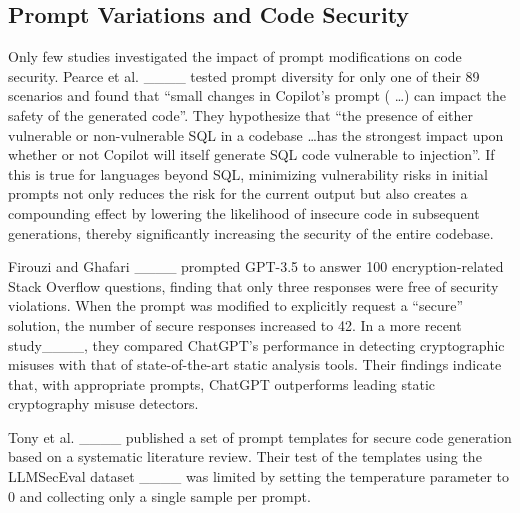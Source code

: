 
\subsection{Prompt Variations and Code Security}
\label{subsec:related_work_prompt_variations} 
Only few studies investigated the impact of prompt modifications on code security. Pearce et al. ____ tested prompt diversity for only one of their 89 scenarios and found that
``small changes in Copilot’s prompt ( \ldots \space) can impact the safety of the generated code''. They hypothesize that ``the presence of either vulnerable or non-vulnerable SQL in a codebase \ldots \space has the strongest impact upon whether or not Copilot will itself generate SQL code vulnerable to injection''. If this is true for languages beyond SQL, minimizing vulnerability risks in initial prompts not only reduces the risk for the current output but also creates a compounding effect by lowering the likelihood of insecure code in subsequent generations, thereby significantly increasing the security of the entire codebase.


Firouzi and Ghafari ____ prompted GPT-3.5 to answer 100 encryption-related Stack Overflow questions, finding that only three responses were free of security violations. When the prompt was modified to explicitly request a ``secure'' solution, the number of secure responses increased to 42.
In a more recent study____, they compared ChatGPT's performance in detecting cryptographic misuses with that of state-of-the-art static analysis tools. Their findings indicate that, with appropriate prompts, ChatGPT outperforms leading static cryptography misuse detectors.


Tony et al. ____ published a set of prompt templates for secure code generation based on a systematic literature review. Their test of the templates using the LLMSecEval dataset ____ was limited by setting the temperature parameter to 0 and collecting only a single sample per prompt. 


